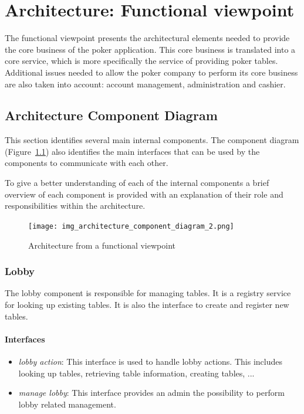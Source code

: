 \documentclass[a4paper,11pt]{report}
\begin{document}
\chapter{Architecture: Functional viewpoint}
The functional viewpoint presents the architectural elements needed to provide the core business of the poker application. This core business is translated into a core service, which is more specifically the service of providing poker tables. Additional issues needed to allow the poker company to perform its core business are also taken into account: account management, administration and cashier.

\section{Architecture Component Diagram}
This section identifies several main internal components. The component diagram (Figure~\ref{fig:component}) also identifies the main interfaces that can be used by the components to communicate with each other.

To give a better understanding of each of the internal components a brief overview of each component is provided with an explanation of their role and responsibilities within the architecture.

\begin{figure}
  \begin{center}
    \texttt{[image: img\_architecture\_component\_diagram\_2.png]}
  \end{center}
  \caption{Architecture from a functional viewpoint}\label{fig:component}
\end{figure}

\subsection{Lobby}
The lobby component is responsible for managing tables. It is a registry service for looking up existing tables. It is also the interface to create and register new tables. 
\subsubsection{Interfaces}
\begin{itemize}
\item \emph{lobby action}: This interface is used to handle lobby actions. This includes looking up tables, retrieving table information, creating tables, ...
\item \emph{manage lobby}: This interface provides an admin the possibility to perform lobby related management.
\end{itemize}
\end{document}
